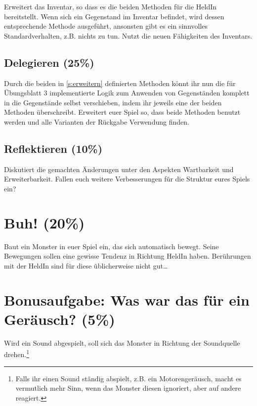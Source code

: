 \documentclass{../pi-aufgabenblatt}
\begin{document}
Erweitert das Inventar, so dass es die beiden Methoden für die HeldIn bereitstellt. Wenn sich ein Gegenstand im Inventar befindet, wird dessen entsprechende Methode ausgeführt, ansonsten gibt es ein sinnvolles Standardverhalten, z.B. nichts zu tun. Nutzt die neuen Fähigkeiten des Inventars.

\subsection{Delegieren (25\%)}

Durch die beiden in \ref{s:erweitern} definierten Methoden könnt ihr nun die für Übungsblatt 3 implementierte Logik zum Anwenden von Gegenständen komplett in die Gegenstände selbst verschieben, indem ihr jeweils eine der beiden Methoden überschreibt. Erweitert euer Spiel so, dass beide Methoden benutzt werden und alle Varianten der Rückgabe Verwendung finden.

\subsection{Reflektieren (10\%)}

Diskutiert die gemachten Änderungen unter den Aspekten Wartbarkeit und Erweiterbarkeit. Fallen euch weitere Verbesserungen für die Struktur eures Spiels ein?

\section{Buh! (20\%)}

Baut ein Monster in euer Spiel ein, das sich automatisch bewegt. Seine Bewegungen sollen eine gewisse Tendenz in Richtung HeldIn haben. Berührungen mit der HeldIn sind für diese üblicherweise nicht gut\ldots

\section{Bonusaufgabe: Was war das für ein Geräusch? (5\%)}

Wird ein Sound abgespielt, soll sich das Monster in Richtung der Soundquelle drehen.\footnote{Falls ihr einen Sound ständig abspielt, z.B. ein Motorengeräusch, macht es vermutlich mehr Sinn, wenn das Monster diesen ignoriert, aber auf andere reagiert.}
\end{document}
